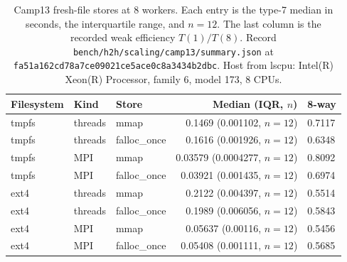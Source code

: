 \begin{table}[tbp]
\centering
\scriptsize
\caption{Camp13 fresh-file stores at 8 workers.
Each entry is the type-7 median in seconds, the interquartile range, and \(n{=}12\).
The last column is the recorded weak efficiency \(T(1)/T(8)\).
Record \texttt{bench/h2h/scaling/camp13/summary.json} at \texttt{fa51a162cd78a7ce09021ce5ace0c8a3434b2dbc}.
Host from lscpu: Intel(R) Xeon(R) Processor, family 6, model 173, 8 CPUs.}
\label{tab:camp13-store}
\begin{tabular}{@{}lllrl@{}}
\toprule
Filesystem & Kind & Store & Median (IQR, $n$) & 8-way \\
\midrule
tmpfs & threads & mmap & 0.1469 (0.001102, $n{=}12$) & 0.7117 \\
tmpfs & threads & falloc\_once & 0.1616 (0.001926, $n{=}12$) & 0.6348 \\
tmpfs & MPI & mmap & 0.03579 (0.0004277, $n{=}12$) & 0.8092 \\
tmpfs & MPI & falloc\_once & 0.03921 (0.001435, $n{=}12$) & 0.6974 \\
ext4 & threads & mmap & 0.2122 (0.004397, $n{=}12$) & 0.5514 \\
ext4 & threads & falloc\_once & 0.1989 (0.006056, $n{=}12$) & 0.5843 \\
ext4 & MPI & mmap & 0.05637 (0.00116, $n{=}12$) & 0.5456 \\
ext4 & MPI & falloc\_once & 0.05408 (0.001111, $n{=}12$) & 0.5685 \\
\bottomrule
\end{tabular}
\end{table}
